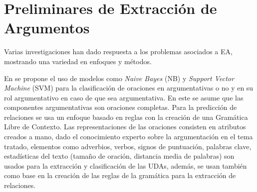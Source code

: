 \documentclass[a4paper,11pt,twocolumn,twoside]{article}
\begin{document}




\section{Preliminares de Extracción de Argumentos}

Varias investigaciones han dado respuesta a los problemas asociados a EA, mostrando
una variedad en enfoques y métodos.

En \cite{palau2009argumentation} se propone
el uso de modelos como \textit{Naive Bayes} (NB) y \textit{Support Vector Machine} (SVM)
para la clasificación de 
oraciones en argumentativas o no y en su rol argumentativo en caso de que sea argumentativa. En este
se asume que las componentes argumentativas son oraciones completas. Para la predicción de relaciones
se usa un enfoque basado en reglas con la creación de una Gramática Libre de Contexto. Las representaciones
de las oraciones consisten en atributos creados a mano, dado el conocimiento experto sobre la argumentación
en el tema tratado, elementos como adverbios, verbos, signos de puntuación, palabras clave, estadísticas del texto
(tamaño de oración, distancia media de palabras) son usados para la extracción y clasificación de las UDAs, además,
se usan también como base en la creación de las reglas de la gramática para la extracción de relaciones.
\end{document}

